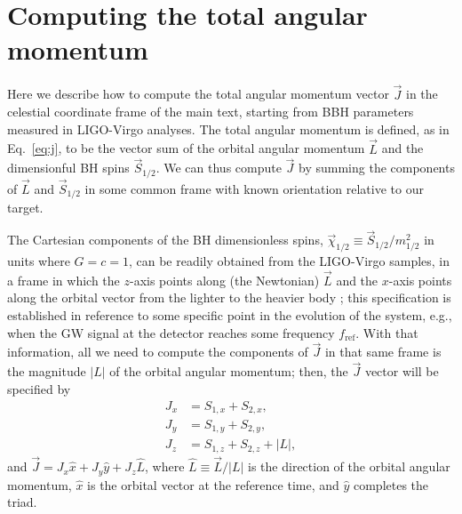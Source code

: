 \documentclass[twocolumn,twocolappendix,linenumbers]{aastex631}
\begin{document}
\section{Computing the total angular momentum}
\label{app:j}

Here we describe how to compute the total angular momentum vector $\vec{J}$ in the celestial coordinate frame of the main text, starting from \ac{BBH} parameters measured in LIGO-Virgo analyses.
The total angular momentum is defined, as in Eq.~\eqref{eq:j}, to be the vector sum of the orbital angular momentum $\vec{L}$ and the dimensionful \ac{BH} spins $\vec{S}_{1/2}$.
We can thus compute $\vec{J}$ by summing the components of $\vec{L}$ and $\vec{S}_{1/2}$ in some common frame with known orientation relative to our target.

The Cartesian components of the \ac{BH} dimensionless spins, $\vec{\chi}_{1/2} \equiv \vec{S}_{1/2} / m_{1/2}^2$ in units where $G=c=1$, can be readily obtained from the LIGO-Virgo samples, in a frame in which the $z$-axis points along (the Newtonian) $\vec{L}$ and the $x$-axis points along the orbital vector from the lighter to the heavier body \citep{LALSuite:spins} \citep[see, e.g., Fig.~18 in][ ]{Isi:2022mbx}; this specification is established in reference to some specific point in the evolution of the system, e.g., when the \ac{GW} signal at the detector reaches some frequency $f_\mathrm{ref}$.
With that information, all we need to compute the components of $\vec{J}$ in that same frame is the magnitude $|L|$ of the orbital angular momentum; then, the $\vec{J}$ vector will be specified by
\begin{subequations}
\label{eq:jcomp}
\begin{align}
J_x &= S_{1,x} + S_{2,x}, \\
J_y &= S_{1,y} + S_{2,y}, \\
J_z &= S_{1,z} + S_{2,z} + |L|,
\end{align}
\end{subequations}
and $\vec{J} = J_x \hat{x} + J_y \hat{y} + J_z \hat{L}$, where $\hat{L} \equiv \vec{L}/|L|$ is the direction of the orbital angular momentum, $\hat{x}$ is the orbital vector at the reference time, and $\hat{y}$ completes the triad.
\end{document}
